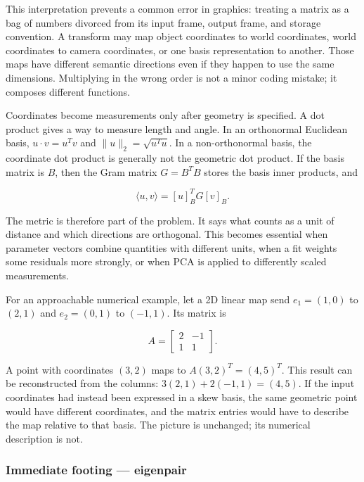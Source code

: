 This interpretation prevents a common error in graphics: treating a matrix as a bag of numbers divorced from its input frame, output frame, and storage convention. A transform may map object coordinates to world coordinates, world coordinates to camera coordinates, or one basis representation to another. Those maps have different semantic directions even if they happen to use the same dimensions. Multiplying in the wrong order is not a minor coding mistake; it composes different functions.

Coordinates become measurements only after geometry is specified. A dot product gives a way to measure length and angle. In an orthonormal Euclidean basis, \(u\cdot v=u^Tv\) and \(\|u\|_2=\sqrt{u^Tu}\). In a non-orthonormal basis, the coordinate dot product is generally not the geometric dot product. If the basis matrix is \(B\), then the Gram matrix \(G=B^TB\) stores the basis inner products, and

\[
\langle u,v\rangle = [u]_B^T G [v]_B.
\]

The metric is therefore part of the problem. It says what counts as a unit of distance and which directions are orthogonal. This becomes essential when parameter vectors combine quantities with different units, when a fit weights some residuals more strongly, or when PCA is applied to differently scaled measurements.

For an approachable numerical example, let a 2D linear map send \(e_1=(1,0)\) to \((2,1)\) and \(e_2=(0,1)\) to \((-1,1)\). Its matrix is

\[
A=\begin{bmatrix}2&-1\\1&1\end{bmatrix}.
\]

A point with coordinates \((3,2)\) maps to \(A(3,2)^T=(4,5)^T\). This result can be reconstructed from the columns: \(3(2,1)+2(-1,1)=(4,5)\). If the input coordinates had instead been expressed in a skew basis, the same geometric point would have different coordinates, and the matrix entries would have to describe the map relative to that basis. The picture is unchanged; its numerical description is not.

\subsubsection{Immediate footing --- eigenpair}\label{01-foundations-i-ch018-immediate-footing-eigenpair}

\hypertarget{01-foundations-i-ch018-immediate-footing-eigenpair}{}


